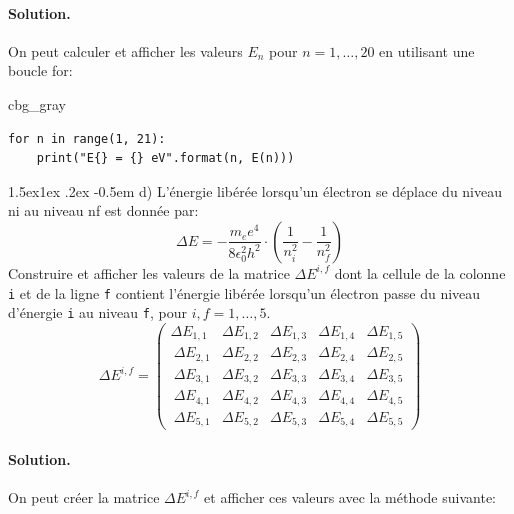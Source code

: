 \documentclass[%
oneside,                 %
final,                   %
10pt,french]{article}
\makeatletter
\newenvironment{_cod_tight}[1]{
   \def\FrameCommand{\colorbox{#1}}
   \FrameRule0.6pt\MakeFramed {\FrameRestore}\vskip3mm}
   {\vskip0mm\endMakeFramed}
\newenvironment{cod}[1]{
\bgroup\rmfamily
\fboxsep=0mm\relax
\begin{_cod_tight}{#1}
\list{}{\parsep=-2mm\parskip=0mm\topsep=0pt\leftmargin=2mm
\rightmargin=2\leftmargin\leftmargin=4pt\relax}
\item\relax}
{\endlist\end{_cod_tight}\egroup}
\newenvironment{doconceexercise}{}{}
\newcommand\subex{\@startsection{paragraph}{4}{\z@}%
                  {1.5ex\@plus1ex \@minus.2ex}%
                  {-0.5em}%
                  {\normalfont\normalsize\bfseries}}
\makeatother
\begin{document}
\begin{doconceexercise}


\paragraph{Solution.}
On peut calculer et afficher les valeurs $E_n$ pour $n = 1,…, 20$ en utilisant une boucle for:
\begin{cod}{cbg_gray}\begin{verbatim}
for n in range(1, 21):
    print("E{} = {} eV".format(n, E(n)))
\end{verbatim}
\end{cod}
\noindent


\subex{d)}
L'énergie libérée lorsqu'un électron se déplace du niveau ni au niveau nf est donnée par:
\begin{equation}
\Delta E = -\frac{m_e e^4}{8\epsilon_0^2h^2}\cdot\left( \frac{1}{n_i^2}-\frac{1}{n_f^2}\right)
\end{equation}
Construire et afficher les valeurs de la matrice $\Delta E^{i,f}$ dont la cellule de la colonne \texttt{i} et de la ligne \texttt{f} contient l’énergie libérée lorsqu’un électron passe du niveau d’énergie \texttt{i} au niveau \texttt{f}, pour $i, f = 1, …, 5$.
\begin{equation}
\Delta E^{i,f} = \begin{pmatrix}
\Delta  E_{1,1}  & \Delta  E_{1,2}  & \Delta  E_{1,3}  & \Delta  E_{1,4}  & \Delta  E_{1,5} \\\
\Delta E_{2,1}  & \Delta  E_{2,2}  & \Delta  E_{2,3}  & \Delta  E_{2,4}  & \Delta  E_{2,5} \\\
\Delta E_{3,1}  & \Delta  E_{3,2}  & \Delta  E_{3,3}  & \Delta  E_{3,4}  & \Delta  E_{3,5} \\\
\Delta E_{4,1}  & \Delta  E_{4,2}  & \Delta  E_{4,3}  & \Delta  E_{4,4}  & \Delta  E_{4,5} \\\
\Delta E_{5,1}  & \Delta  E_{5,2}  & \Delta  E_{5,3}  & \Delta  E_{5,4}  & \Delta  E_{5,5}
\end{pmatrix}
\end{equation}


\paragraph{Solution.}
On peut créer la matrice $\Delta E^{i,f}$ et afficher ces valeurs avec la méthode suivante:


\end{doconceexercise}
\end{document}
